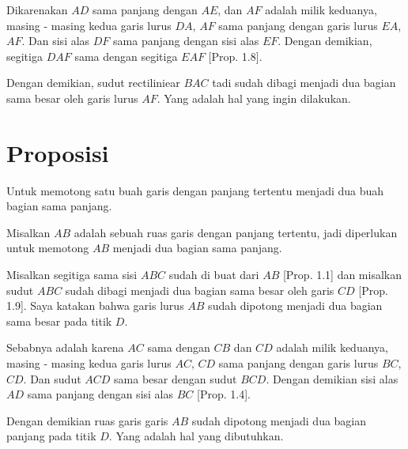 \documentclass[a4paper]{book}
\begin{document}
Dikarenakan $AD$ sama panjang dengan $AE$, dan $AF$ adalah milik keduanya, masing - masing
kedua garis lurus $DA$, $AF$ sama panjang dengan garis lurus $EA$, $AF$. Dan 
sisi alas $DF$ sama panjang dengan sisi alas $EF$. Dengan demikian, segitiga
$DAF$ sama dengan segitiga $EAF$ [Prop. 1.8].

Dengan demikian, sudut rectiliniear $BAC$ tadi sudah dibagi menjadi dua bagian
sama besar oleh garis lurus $AF$. Yang adalah hal yang ingin dilakukan.

\section*{\centering Proposisi \thesection} 
Untuk memotong satu buah garis dengan panjang tertentu menjadi dua buah bagian 
sama panjang.  
\begin{center}
\end{center}

Misalkan $AB$ adalah sebuah ruas garis dengan panjang tertentu, jadi diperlukan
untuk memotong $AB$ menjadi dua bagian sama panjang.

Misalkan segitiga sama sisi $ABC$ sudah di buat dari $AB$ [Prop. 1.1] dan
misalkan sudut $ABC$ sudah dibagi menjadi dua bagian sama besar oleh garis 
$CD$ [Prop. 1.9]. Saya katakan bahwa garis lurus $AB$ sudah dipotong menjadi
dua bagian sama besar pada titik $D$.

Sebabnya adalah karena $AC$ sama dengan $CB$ dan $CD$ adalah milik keduanya, masing - masing
kedua garis lurus $AC$, $CD$ sama panjang dengan garis lurus $BC$, $CD$. Dan 
sudut $ACD$ sama besar dengan sudut $BCD$. Dengan demikian sisi alas $AD$ sama
panjang dengan sisi alas $BC$ [Prop. 1.4].

Dengan demikian ruas garis garis $AB$ sudah dipotong menjadi dua bagian panjang
pada titik $D$. Yang adalah hal yang dibutuhkan.

\end{document}
